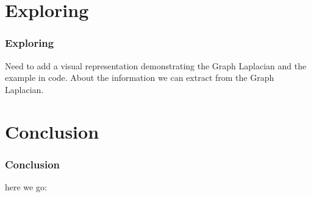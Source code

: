 \documentclass{beamer}
\begin{document}
\section{Exploring}
\begin{frame}
\frametitle{\textbf{Exploring} }

Need to add a visual representation demonstrating the Graph Laplacian and the example in code. About the information we can extract from the Graph Laplacian.

\end{frame}


\section{Conclusion}
\begin{frame}
\frametitle{Conclusion}

here we go: \vspace{0.2 cm}


\end{frame}




\end{document}
